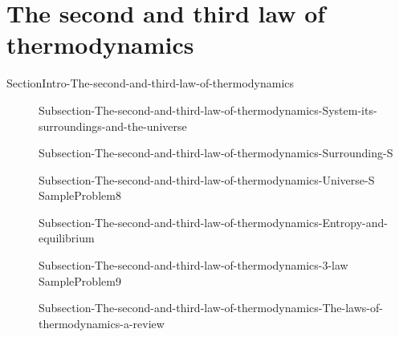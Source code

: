 \documentclass[main.tex]{subfiles}
\begin{document}
\section{The second and third law of thermodynamics}{SectionIntro-The-second-and-third-law-of-thermodynamics}
\sloppy\begin{description}
\item[] {Subsection-The-second-and-third-law-of-thermodynamics-System-its-surroundings-and-the-universe}
\item[] {Subsection-The-second-and-third-law-of-thermodynamics-Surrounding-S}
\item[] {Subsection-The-second-and-third-law-of-thermodynamics-Universe-S}
{SampleProblem8}
 \item[] {Subsection-The-second-and-third-law-of-thermodynamics-Entropy-and-equilibrium}
\item[] {Subsection-The-second-and-third-law-of-thermodynamics-3-law}
{SampleProblem9}
 \item[] {Subsection-The-second-and-third-law-of-thermodynamics-The-laws-of-thermodynamics-a-review}
\end{description}
\end{document}
